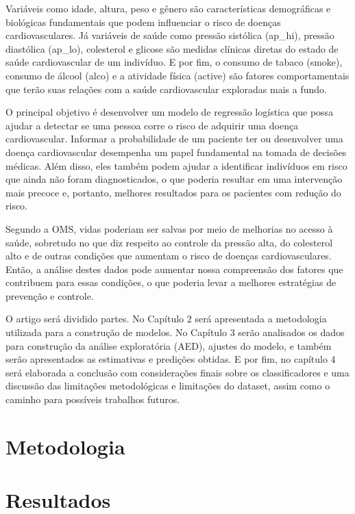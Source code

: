 \documentclass[article,11pt,a4paper,brazil]{abntex2}
\begin{document}
	\newpage
	Variáveis como idade, altura, peso e gênero são características demográficas e biológicas fundamentais que podem influenciar o risco de doenças cardiovasculares. Já variáveis de saúde como pressão sistólica (ap\_hi), pressão diastólica (ap\_lo), colesterol e glicose são medidas clínicas diretas do estado de saúde cardiovascular de um indivíduo. E por fim, o consumo de tabaco (smoke), consumo de álcool (alco) e a atividade física (active) são fatores comportamentais que terão suas relações com a saúde cardiovascular exploradas mais a fundo. 
	
	O principal objetivo é desenvolver um modelo de regressão logística que possa ajudar a detectar se uma pessoa corre o risco de adquirir uma doença cardiovascular. Informar a probabilidade de um paciente ter ou desenvolver uma doença cardiovascular desempenha um papel fundamental na tomada de decisões médicas. Além disso, eles também podem ajudar a identificar indivíduos em risco que ainda não foram diagnosticados, o que poderia resultar em uma intervenção mais precoce e, portanto, melhores resultados para os pacientes com redução do risco. 
	
	Segundo a OMS, vidas poderiam ser salvas por meio de melhorias no acesso à saúde, sobretudo no que diz respeito ao controle da pressão alta, do colesterol alto e de outras condições que aumentam o risco de doenças cardiovasculares. Então, a análise destes dados pode aumentar nossa compreensão dos fatores que contribuem para essas condições, o que poderia levar a melhores estratégias de prevenção e controle.
	
	O artigo será dividido partes. No Capítulo 2 será apresentada a metodologia utilizada para a construção de modelos. No Capítulo 3 serão analisados os dados para construção da análise exploratória (AED), ajustes do modelo, e também serão apresentados as estimativas e predições obtidas. E por fim, no capítulo 4 será elaborada a conclusão com considerações finais sobre os classificadores e uma discussão das limitações metodológicas e limitações do dataset, assim como o caminho para possíveis trabalhos futuros.
	\section{Metodologia}
	
	
	\newpage
	\thispagestyle{plain}
	\section{Resultados}
	
\end{document}
